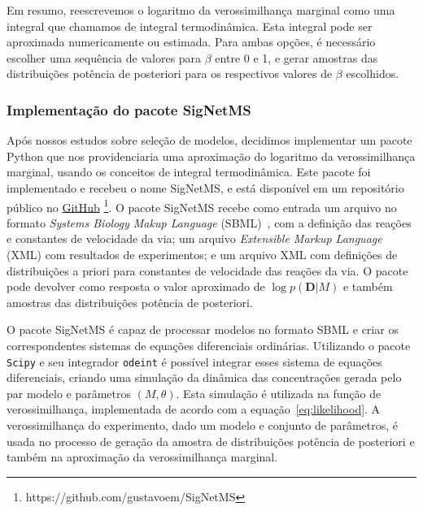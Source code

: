 \documentclass[12pt]{article}
\newcommand{\algname}[1]{\texttt{#1}}
\begin{document}
Em resumo, reescrevemos o logaritmo da verossimilhança marginal como uma
integral que chamamos de integral termodinâmica. Esta integral pode ser
aproximada numericamente ou estimada. Para ambas opções, é necessário 
escolher uma sequência de valores para $\beta$ entre 0 e 1, e gerar
amostras das distribuições potência de posteriori para os respectivos
valores de $\beta$ escolhidos.

\subsubsection{Implementação do pacote SigNetMS}
Após nossos estudos sobre seleção de modelos, decidimos implementar
um pacote Python que nos providenciaria uma aproximação do logaritmo da
verossimilhança marginal, usando os conceitos de integral termodinâmica.
Este pacote foi implementado e recebeu o nome SigNetMS, e está 
disponível em um repositório público no
\href{https://github.com/gustavoem/SigNetMS}{GitHub}
\footnote{https://github.com/gustavoem/SigNetMS}. O pacote SigNetMS 
recebe como entrada um arquivo no formato \emph{Systems Biology Makup
Language} (SBML)~\cite{hucka2003systems}, com a definição das reações e 
constantes de velocidade da via; um arquivo \emph{Extensible Markup 
Language} (XML) com resultados de experimentos; e um arquivo XML com 
definições de distribuições a priori para constantes de velocidade das
reações da via. O pacote pode devolver como resposta o valor aproximado
de $\log p (\mathbf{D} | M)$ e também amostras das distribuições
potência de posteriori.

O pacote SigNetMS é capaz de processar modelos no formato SBML e criar
os correspondentes sistemas de equações diferenciais ordinárias.
Utilizando o pacote \algname{Scipy} e seu integrador \algname{odeint} é
possível integrar esses sistema de equações diferenciais, criando uma
simulação da dinâmica das concentrações gerada pelo par modelo e 
parâmetros $(M, \theta)$. Esta simulação é utilizada na função de 
verossimilhança, implementada de acordo com a 
equação~\ref{eq:likelihood}. A verossimilhança do experimento, dado um
modelo e conjunto de parâmetros, é usada no processo de geração da
amostra de distribuições potência de posteriori e também na aproximação 
da verossimilhança marginal.
\end{document}
